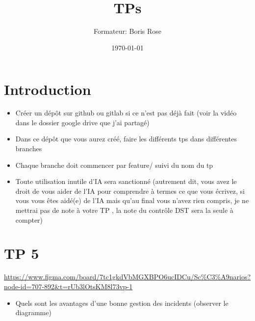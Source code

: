 \documentclass[12pt, letterpaper]{article}
\title{TPs}
\author{Formateur: Boris Rose}
\date{\today}
\begin{document}
\maketitle

\section*{Introduction}

\begin{tcolorbox}[colback=brown!5,colframe=brown!60!black,title=Consignes]

\begin{itemize}
    \item Créer un dépôt sur github ou gitlab si ce n'est pas déjà fait (voir la vidéo dans le dossier google drive que j'ai partagé)
    \item Dans ce dépôt que vous aurez créé, faire les différents tps dans différentes branches
    \item Chaque branche doit commencer par feature/ suivi du nom du tp 
    \item Toute utilisation inutile d'IA sera sanctionné (autrement dit, vous avez le droit de vous aider de l'IA pour comprendre à termes ce que vous écrivez, si vous vous êtes aidé(e) de l'IA mais qu'au final vous n'avez rien compris, je ne mettrai pas de note à votre TP , la note du contrôle DST sera la seule à compter)
\end{itemize}


\end{tcolorbox}


\section*{TP 5}


\begin{tcolorbox}[colback=cyan!5,colframe=cyan!60!black,title=Figma du Cours]
    \url{https://www.figma.com/board/7tc1gkdVbMGXBPO6ucIDCu/Sc%C3%A9narios?node-id=707-892&t=rUb3lOtsKM8l73vp-1}
\end{tcolorbox}

\begin{itemize}
    \item Quels sont les avantages d'une bonne gestion des incidents (observer le diagramme)

\end{itemize}
\end{document}
